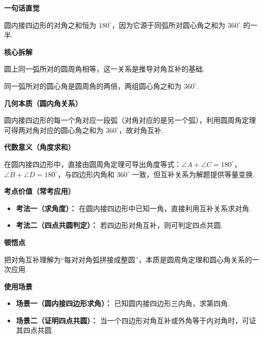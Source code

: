 \begin{explanationbox}
	\textbf{\textcolor{CExplanation}{一句话直觉}}

	圆内接四边形的对角之和恒为 $180^\circ$，因为它源于同弧所对圆心角之和为 $360^\circ$ 的一半.

	\medskip
	\textbf{\textcolor{CExplanation}{核心拆解}}
	\begin{description}[style=nextline, leftmargin=2.8em, labelsep=0.5em, itemsep=0.45em]
		\item[\textbf{要点一（圆周角定理）：}] 圆上同一弧所对的圆周角相等，这一关系是推导对角互补的基础.
		\item[\textbf{要点二（圆心角关系）：}] 同一弧所对的圆心角是圆周角的两倍，两组圆心角之和为 $360^\circ$.
	\end{description}

	\medskip
	\textbf{\textcolor{CExplanation}{几何本质（圆内角关系）}}

	圆内接四边形的每一个角对应一段弧（对角对应的是另一个弧），利用圆周角定理可得两对角对应的圆心角之和为 $360^\circ$，故对角互补.

	\medskip
	\textbf{\textcolor{CExplanation}{代数意义（角度求和）}}

	在圆内接四边形中，直接由圆周角定理可导出角度等式：$\angle A + \angle C = 180^\circ$，$\angle B + \angle D = 180^\circ$，与四边形内角和 $360^\circ$ 一致，但互补关系为解题提供等量变换.

	\medskip
	\textbf{\textcolor{CExplanation}{考点价值（常考应用）}}
	\begin{itemize}[leftmargin=*, itemsep=0.5em, topsep=0.4em]
		\item \textbf{考法一（求角度）：} 在圆内接四边形中已知一角，直接利用互补关系求对角.
		\item \textbf{考法二（四点共圆判定）：} 若四边形对角互补，则可判定四点共圆.
	\end{itemize}

	\medskip
	\textbf{\textcolor{CExplanation}{顿悟点}}

	把对角互补理解为“每对对角弧拼接成整圆”，本质是圆周角定理和圆心角关系的一次应用.

	\medskip
	\textbf{\textcolor{CExplanation}{使用场景}}
	\begin{itemize}[leftmargin=*, itemsep=0.5em, topsep=0.4em]
		\item \textbf{场景一（圆内接四边形求角）：} 已知圆内接四边形三内角，求第四角.
		\item \textbf{场景二（证明四点共圆）：} 当一个四边形对角互补或外角等于内对角时，可证其四点共圆.
	\end{itemize}
\end{explanationbox}

